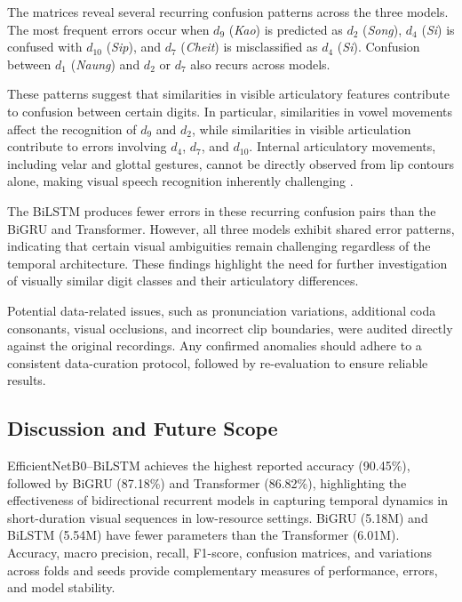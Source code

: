 \documentclass[journal]{IEEEtran}
\begin{document}
The matrices reveal several recurring confusion patterns across the three models. The most frequent errors occur when $d_9$ (\textit{Kao}) is predicted as $d_2$ (\textit{Song}), $d_4$ (\textit{Si}) is confused with $d_{10}$ (\textit{Sip}), and $d_7$ (\textit{Cheit}) is misclassified as $d_4$ (\textit{Si}). Confusion between $d_1$ (\textit{Naung}) and $d_2$ or $d_7$ also recurs across models.

These patterns suggest that similarities in visible articulatory features contribute to confusion between certain digits. In particular, similarities in vowel movements affect the recognition of $d_9$ and $d_2$, while similarities in visible articulation contribute to errors involving $d_4$, $d_7$, and $d_{10}$. Internal articulatory movements, including velar and glottal gestures, cannot be directly observed from lip contours alone, making visual speech recognition inherently challenging \cite{sheng2024visual}.

The BiLSTM produces fewer errors in these recurring confusion pairs than the BiGRU and Transformer. However, all three models exhibit shared error patterns, indicating that certain visual ambiguities remain challenging regardless of the temporal architecture. These findings highlight the need for further investigation of visually similar digit classes and their articulatory differences.

Potential data-related issues, such as pronunciation variations, additional coda consonants, visual occlusions, and incorrect clip boundaries, were audited directly against the original recordings. Any confirmed anomalies should adhere to a consistent data-curation protocol, followed by re-evaluation to ensure reliable results.

\subsection{Discussion and Future Scope}

EfficientNetB0--BiLSTM achieves the highest reported accuracy (90.45\%), followed by BiGRU (87.18\%) and Transformer (86.82\%), highlighting the effectiveness of bidirectional recurrent models in capturing temporal dynamics in short-duration visual sequences in low-resource settings. BiGRU (5.18M) and BiLSTM (5.54M) have fewer parameters than the Transformer (6.01M). Accuracy, macro precision, recall, F1-score, confusion matrices, and variations across folds and seeds provide complementary measures of performance, errors, and model stability.
\end{document}
